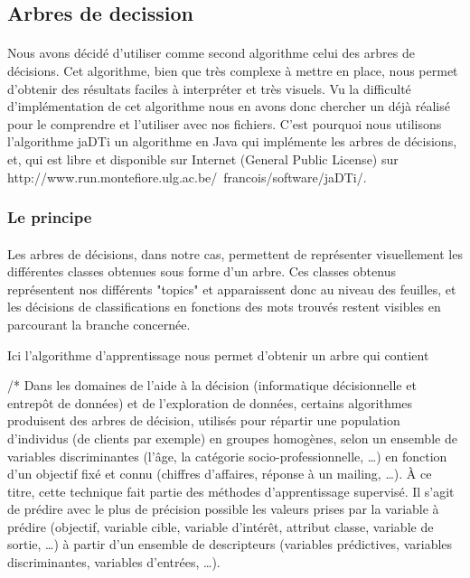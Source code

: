 \subsection{Arbres de decission}

\paragraph{}
Nous avons décidé d'utiliser comme second algorithme celui des arbres de décisions. Cet algorithme, bien que très complexe à mettre en place, nous permet d'obtenir des résultats faciles à interpréter et très visuels.
Vu la difficulté d'implémentation de cet algorithme nous en avons donc chercher un déjà réalisé pour le comprendre et l'utiliser avec nos fichiers. C'est pourquoi nous utilisons l'algorithme jaDTi un algorithme en Java qui implémente les arbres de décisions, et, qui est libre et disponible sur Internet (General Public License) sur http://www.run.montefiore.ulg.ac.be/~francois/software/jaDTi/. 


\subsubsection{Le principe} 
\paragraph{}
Les arbres de décisions, dans notre cas, permettent de représenter visuellement les différentes classes obtenues sous forme d'un arbre. Ces classes obtenus représentent nos différents "topics" et apparaissent donc au niveau des feuilles, et les décisions de classifications en fonctions des mots trouvés restent visibles en parcourant la branche concernée.

Ici l'algorithme d'apprentissage nous permet d'obtenir un arbre qui contient 


/* Dans les domaines de l'aide à la décision (informatique décisionnelle et entrepôt de données) et de l'exploration de données, certains algorithmes produisent des arbres de décision, utilisés pour répartir une population d'individus (de clients par exemple) en groupes homogènes, selon un ensemble de variables discriminantes (l'âge, la catégorie socio-professionnelle, …) en fonction d'un objectif fixé et connu (chiffres d'affaires, réponse à un mailing, …). À ce titre, cette technique fait partie des méthodes d’apprentissage supervisé. Il s’agit de prédire avec le plus de précision possible les valeurs prises par la variable à prédire (objectif, variable cible, variable d’intérêt, attribut classe, variable de sortie, …) à partir d’un ensemble de descripteurs (variables prédictives, variables discriminantes, variables d'entrées, …).

